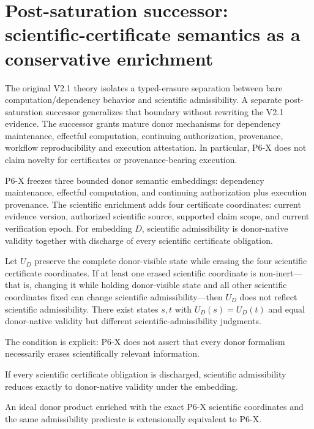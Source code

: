\section{Post-saturation successor: scientific-certificate semantics as a conservative enrichment}
\label{sec:p6x-successor}

The original V2.1 theory isolates a typed-erasure separation between bare
computation/dependency behavior and scientific admissibility.  A separate
post-saturation successor generalizes that boundary without rewriting the V2.1
evidence.  The successor grants mature donor mechanisms for dependency
maintenance, effectful computation, continuing authorization, provenance,
workflow reproducibility and execution attestation.  In particular, P6-X does
not claim novelty for certificates or provenance-bearing execution.

P6-X freezes three bounded donor semantic embeddings: dependency maintenance,
effectful computation, and continuing authorization plus execution provenance.
The scientific enrichment adds four certificate coordinates: current evidence
version, authorized scientific source, supported claim scope, and current
verification epoch.  For embedding $D$, scientific admissibility is donor-native
validity together with discharge of every scientific certificate obligation.

\begin{theorem}
Let $U_D$ preserve the complete donor-visible state while erasing the four
scientific certificate coordinates.  If at least one erased scientific
coordinate is non-inert---that is, changing it while holding donor-visible state
and all other scientific coordinates fixed can change scientific
admissibility---then $U_D$ does not reflect scientific admissibility.  There
exist states $s,t$ with $U_D(s)=U_D(t)$ and equal donor-native validity but
different scientific-admissibility judgments.
\end{theorem}

The condition is explicit: P6-X does not assert that every donor formalism
necessarily erases scientifically relevant information.

\begin{theorem}
If every scientific certificate obligation is discharged, scientific
admissibility reduces exactly to donor-native validity under the embedding.
\end{theorem}

\begin{theorem}
An ideal donor product enriched with the exact P6-X scientific coordinates and
the same admissibility predicate is extensionally equivalent to P6-X.
\end{theorem}


